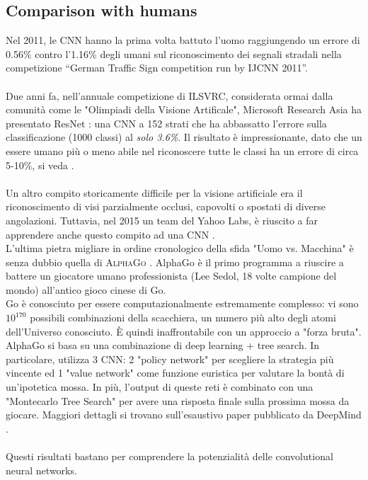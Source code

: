 \subsection{Comparison with humans}
Nel 2011, le CNN hanno la prima volta battuto l’uomo raggiungendo un errore di 0.56\% contro l’1.16\% degli umani sul riconoscimento dei segnali stradali nella competizione “German Traffic Sign competition run by IJCNN 2011”. \\
\\
Due anni fa, nell'annuale competizione di ILSVRC, considerata ormai dalla comunità come le "Olimpiadi della Visione Artificale", Microsoft Research Asia ha presentato ResNet \parencite{resnet}: una CNN a 152 strati che ha abbassatto l'errore sulla classificazione (1000 classi) al \emph{solo 3.6\%}. Il risultato è impressionante, dato che un essere umano più o meno abile nel riconoscere tutte le classi ha un errore di circa 5-10\%, si veda \parencite{Wkarpa}. \\
\\
Un altro compito storicamente difficile per la visione artificiale era il riconoscimento di visi parzialmente occlusi, capovolti o spostati di diverse angolazioni. Tuttavia, nel 2015 un team del Yahoo Labs, è riuscito a far apprendere anche questo compito ad una CNN \parencite{WMit}.\\

L'ultima pietra migliare in ordine cronologico della sfida "Uomo vs. Macchina" è senza dubbio quella di \textsc{AlphaGo} \parencite{WAlphaGo}. AlphaGo è il primo programma a riuscire a battere un giocatore umano professionista (Lee Sedol, 18 volte campione del mondo) all'antico gioco cinese di Go. \\
Go è conosciuto per essere computazionalmente estremamente complesso: vi sono $10^{170}$ possibili combinazioni della scacchiera, un numero più alto degli atomi dell'Universo conosciuto. È quindi inaffrontabile con un approccio a "forza bruta". 
\\
AlphaGo si basa su una combinazione di deep learning + tree search. In particolare, utilizza 3 CNN: 2 "policy network" per scegliere la strategia più vincente ed 1 "value network" come funzione euristica per valutare la bontà di un'ipotetica mossa. In più, l'output di queste reti è combinato con una "Montecarlo Tree Search" per avere una risposta finale sulla prossima mossa da giocare. Maggiori dettagli si trovano sull'esaustivo paper pubblicato da DeepMind \parencite{AlphaGo}. \\
\\
Questi risultati bastano per comprendere la potenzialità delle convolutional neural networks.
